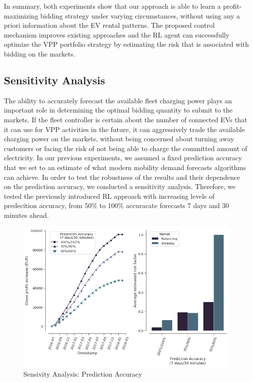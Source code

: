 \documentclass[a4paper, 12pt]{article}
\begin{document}
In summary, both experiments show that our approach is able to learn a
profit-maximizing bidding strategy under varying circumstances, without using
any a priori information about the EV rental patterns. The proposed control
mechanism improves existing approaches and the RL agent can successfully
optimize the VPP portfolio strategy by estimating the risk that is associated
with bidding on the markets.

\subsection{Sensitivity Analysis}
\label{sec:orge692fde}
The ability to accurately forecast the available fleet charging power plays an
important role in determining the optimal bidding quantity to submit to the
markets. If the fleet controller is certain about the number of connected EVs
that it can use for VPP activities in the future, it can aggressively trade the
available charging power on the markets, without being concerned about turning
away customers or facing the risk of not being able to charge the committed
amount of electricity. In our previous experiments, we assumed a fixed
prediction accuracy that we set to an estimate of what modern mobility demand
forecasts algorithms can achieve. In order to test the robustness of the results
and their dependence on the prediction accuracy, we conducted a sensitivity
analysis. Therefore, we tested the previously introduced RL approach with
increasing levels of predecition accuracy, from 50\% to 100\% accuracate forecasts
7 days and 30 minutes ahead.

\begin{figure}[htbp]
\centering
\includegraphics[width=1\linewidth]{fig/rl-accuracy.png}
\caption[Sensivity Analysis: Prediction Accuracy]{Sensivity Analysis: Prediction Accuracy \label{fig-sens-accuracy}}
\end{figure}
\end{document}
